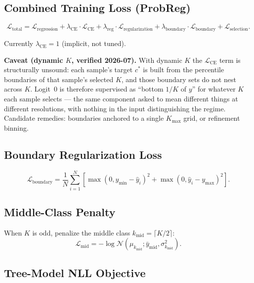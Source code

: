 \documentclass[11pt,a4paper]{article}
\theoremstyle{definition}
\begin{document}
\subsection{Combined Training Loss (ProbReg)}

\begin{equation}
  \mathcal{L}_{\mathrm{total}} = \mathcal{L}_{\mathrm{regression}} +
  \lambda_{\mathrm{CE}} \cdot \mathcal{L}_{\mathrm{CE}} +
  \lambda_{\mathrm{reg}} \cdot \mathcal{L}_{\mathrm{regularization}} +
  \lambda_{\mathrm{boundary}} \cdot \mathcal{L}_{\mathrm{boundary}} +
  \mathcal{L}_{\mathrm{selection}}.
  \label{eq:total_loss}
\end{equation}

Currently $\lambda_{\mathrm{CE}} = 1$ (implicit, not tuned).

\begin{implnote}
\textbf{Caveat (dynamic $K$, verified 2026-07).} With dynamic $K$ the
$\mathcal{L}_{\mathrm{CE}}$ term is structurally unsound: each sample's target $c^*$ is built
from the percentile boundaries of that sample's selected $K$, and those boundary sets do not
nest across $K$. Logit~0 is therefore supervised as ``bottom $1/K$ of $y$'' for whatever $K$
each sample selects — the same component asked to mean different things at different
resolutions, with nothing in the input distinguishing the regime. Candidate remedies: boundaries
anchored to a single $K_{\max}$ grid, or refinement binning.
\end{implnote}

\subsection{Boundary Regularization Loss}

\[
  \mathcal{L}_{\mathrm{boundary}} =
  \frac{1}{N}\sum_{i=1}^{N} \left[
    \max(0, y_{\min} - \hat{y}_i)^2 +
    \max(0, \hat{y}_i - y_{\max})^2
  \right].
\]

\subsection{Middle-Class Penalty}

When $K$ is odd, penalize the middle class $k_{\mathrm{mid}} = \lceil K/2 \rceil$:
\[
  \mathcal{L}_{\mathrm{mid}} = -\log\mathcal{N}(\mu_{k_{\mathrm{mid}}}; \bar{y}_{\mathrm{mid}}, \sigma_{k_{\mathrm{mid}}}^2).
\]

\subsection{Tree-Model NLL Objective}
\end{document}
